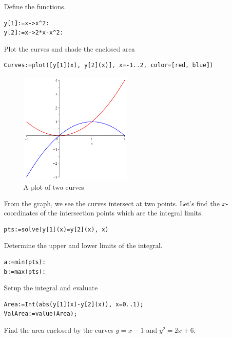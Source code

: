 \documentclass[
  en,11pt,simple]{elegantbook}
\renewenvironment{example}[1][]{
  \refstepcounter{exam}
  \par\noindent\textbf{\color{main}{\examplename} \theexam #1}
  \rmfamily
}{
  \par\ignorespacesafterend
}
\begin{document}
\begin{solution}
{}
Define the functions.

\begin{verbatim}
y[1]:=x->x^2:
y[2]:=x->2*x-x^2:
\end{verbatim}

Plot the curves and shade the enclosed area

\begin{verbatim}
Curves:=plot([y[1](x), y[2](x)], x=-1..2, color=[red, blue])
\end{verbatim}

\begin{figure}
\centering
\includegraphics[width=0.5\textwidth,height=\textheight]{figs/Area-between-two-curves.png}
\caption{A plot of two curves}
\end{figure}

From the graph, we see the curves intersect at two points. Let's find the \(x\)-coordinates of the intersection points which are the integral limits.

\begin{verbatim}
pts:=solve(y[1](x)=y[2](x), x)
\end{verbatim}

Determine the upper and lower limits of the integral.

\begin{verbatim}
a:=min(pts):
b:=max(pts):
\end{verbatim}

Setup the integral and evaluate

\begin{verbatim}
Area:=Int(abs(y[1](x)-y[2](x)), x=0..1);
ValArea:=value(Area);
\end{verbatim}
\end{solution}

\begin{example}

Find the area enclosed by the curves \(y=x-1\) and \(y^2=2x+6\).
\end{example}
\end{document}
